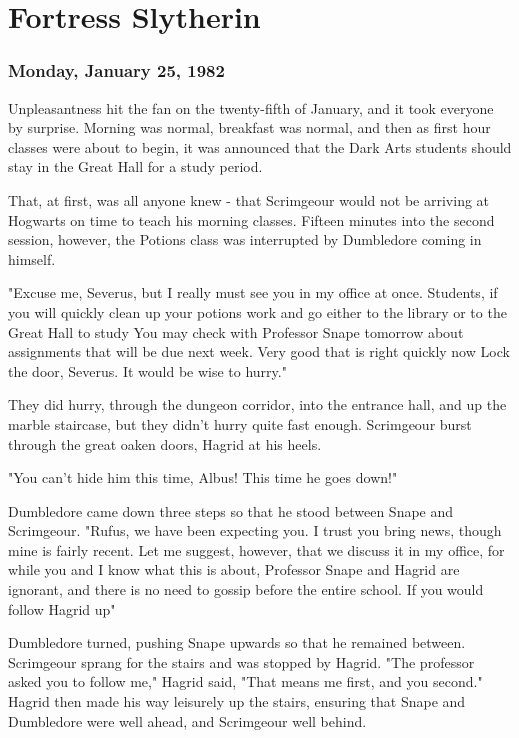 
\chapter{Fortress Slytherin}

\subsection{Monday, January 25, 1982}

Unpleasantness hit the fan on the twenty-fifth of January, and it took everyone by surprise. Morning was normal, breakfast was normal, and then as first hour classes were about to begin, it was announced that the Dark Arts students should stay in the Great Hall for a study period.

That, at first, was all anyone knew - that Scrimgeour would not be arriving at Hogwarts on time to teach his morning classes. Fifteen minutes into the second session, however, the Potions class was interrupted by Dumbledore coming in himself.

"Excuse me, Severus, but I really must see you in my office at once. Students, if you will quickly clean up your potions work and go either to the library or to the Great Hall to study{\el} You may check with Professor Snape tomorrow about assignments that will be due next week. Very good{\el} that is right{\el} quickly now{\el} Lock the door, Severus. It would be wise to hurry."

They did hurry, through the dungeon corridor, into the entrance hall, and up the marble staircase, but they didn't hurry quite fast enough. Scrimgeour burst through the great oaken doors, Hagrid at his heels.

"You can't hide him this time, Albus! This time he goes down!"

Dumbledore came down three steps so that he stood between Snape and Scrimgeour. "Rufus, we have been expecting you. I trust you bring news, though mine is fairly recent. Let me suggest, however, that we discuss it in my office, for while you and I know what this is about, Professor Snape and Hagrid are ignorant, and there is no need to gossip before the entire school. If you would follow Hagrid up{\el}"

Dumbledore turned, pushing Snape upwards so that he remained between. Scrimgeour sprang for the stairs and was stopped by Hagrid. "The professor asked you to follow me," Hagrid said, "That means me first, and you second." Hagrid then made his way leisurely up the stairs, ensuring that Snape and Dumbledore were well ahead, and Scrimgeour well behind.

